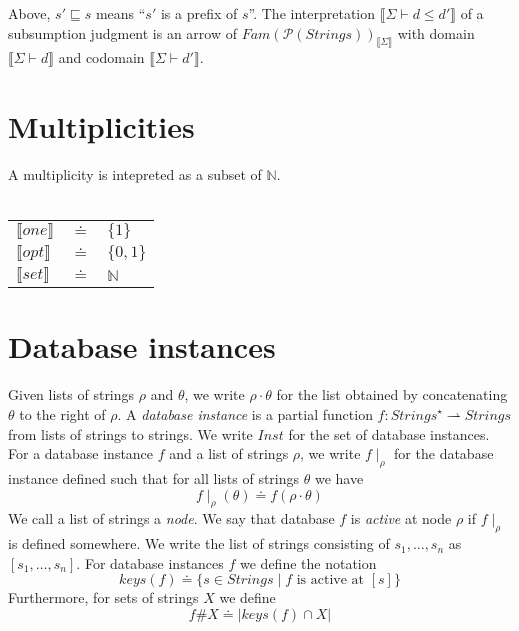 \documentclass{article}
\newcommand{\sem}[1]{\llbracket #1 \rrbracket}
\begin{document}

Above, $s' \sqsubseteq s$ means ``$s'$ is a prefix of $s$''. 
The interpretation $\sem{\Sigma \vdash d \leq d'}$ of a subsumption judgment is an arrow of $\mathit{Fam}(\mathcal P(\mathit{Strings}))_{\sem{\Sigma}}$ with domain $\sem{\Sigma \vdash d}$ and codomain $\sem{\Sigma \vdash d'}$. 

\section*{Multiplicities}

A multiplicity is intepreted as a subset of $\mathbb N$.\\~\\
\begin{tabular}{lll}
$\sem{one}$ & $\doteq$ & $\{ 1 \}$ \\
$\sem{opt}$ & $\doteq$ & $\{ 0, 1 \}$ \\
$\sem{set}$ & $\doteq$ & $\mathbb N$
\end{tabular}
\section*{Database instances}

Given lists of strings $\rho$ and $\theta$, we write $\rho \cdot \theta$ for the list obtained by concatenating $\theta$ to the right of $\rho$. A \emph{database instance} is a partial function $f : \mathit{Strings}^{\star} \rightharpoonup \mathit{Strings}$ from lists of strings to strings. We write $\mathit{Inst}$ for the set of database instances. For a database instance $f$ and a list of strings $\rho$, we write $f \! \mid_\rho$ for the database instance defined such that for all lists of strings $\theta$ we have $$f \! \mid_\rho \! (\theta) \doteq f(\rho \cdot \theta)$$ We call a list of strings a \emph{node}. We say that database $f$ is \emph{active} at node $\rho$ if $f \! \mid_\rho$ is defined somewhere. We write the list of strings consisting of $s_1, \ldots, s_n$ as $[s_1,\ldots,s_n]$. For database instances $f$ we define the notation $$\mathit{keys}(f) \doteq \{ s \in \mathit{Strings} \mid f \text{ is active at } [s] \}$$ Furthermore, for sets of strings $X$ we define
$$f \# X \doteq | \mathit{keys}(f) \cap X |$$ 
\end{document}

